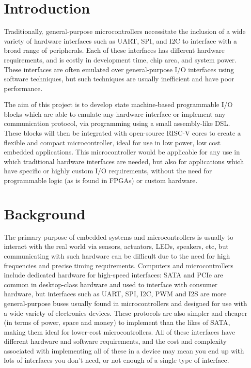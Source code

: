 \documentclass[a4paper,fleqn,12pt]{article}
\begin{document}


\pagestyle{plain}

\section{Introduction}
Traditionally, general-purpose microcontrollers necessitate the inclusion of a wide variety of hardware interfaces such as UART, SPI, and I2C to interface with a broad range of peripherals. Each of these interfaces has different hardware requirements, and is costly in development time, chip area, and system power. These interfaces are often emulated over general-purpose I/O interfaces using software techniques, but such techniques are usually inefficient and have poor performance.

The aim of this project is to develop state machine-based programmable I/O blocks which are able to emulate any hardware interface or implement any communication protocol, via programming using a small assembly-like DSL. These blocks will then be integrated with open-source RISC-V cores to create a flexible and compact microcontroller, ideal for use in low power, low cost embedded applications. This microcontroller would be applicable for any use in which traditional hardware interfaces are needed, but also for applications which have specific or highly custom I/O requirements, without the need for programmable logic (as is found in FPGAs) or custom hardware.

\section{Background}

The primary purpose of embedded systems and microcontrollers is usually to interact with the real world via sensors, actuators, LEDs, speakers, etc, but communicating with such hardware can be difficult due to the need for high frequencies and precise timing requirements. Computers and microcontrollers include dedicated hardware for high-speed interfaces: SATA and PCIe are common in desktop-class hardware and used to interface with consumer hardware, but interfaces such as UART, SPI, I2C, PWM and I2S are more general-purpose buses usually found in microcontrollers and designed for use with a wide variety of electronics devices. These protocols are also simpler and cheaper (in terms of power, space and money) to implement than the likes of SATA, making them ideal for lower-cost microcontrollers. All of these interfaces have different hardware and software requirements, and the cost and complexity associated with implementing all of these in a device may mean you end up with lots of interfaces you don't need, or not enough of a single type of interface.
\end{document}

